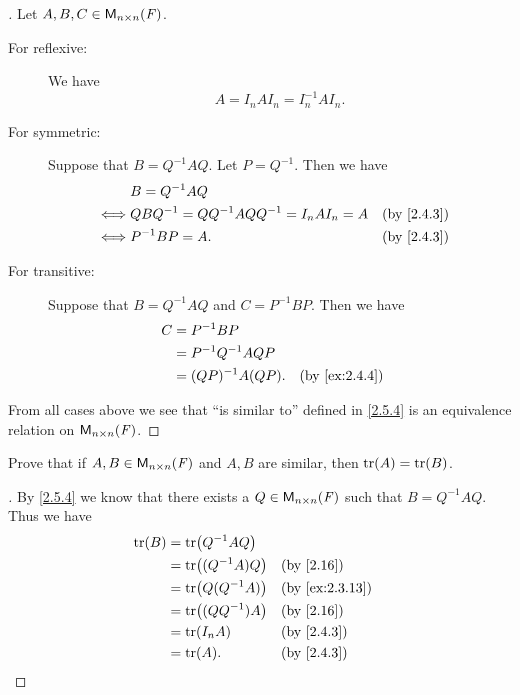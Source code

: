 \begin{proof}[]
  Let \(A, B, C \in \ms[n][n][\F]\).
  \begin{description}
    \item[For reflexive:]
      We have
      \[
        A = I_n A I_n = I_n^{-1} A I_n.
      \]
    \item[For symmetric:]
      Suppose that \(B = Q^{-1} A Q\).
      Let \(P = Q^{-1}\).
      Then we have
      \begin{align*}
             & B = Q^{-1} A Q                                                   \\
        \iff & Q B Q^{-1} = Q Q^{-1} A Q Q^{-1} = I_n A I_n = A &  & \by{2.4.3} \\
        \iff & P^{-1} B P = A.                                  &  & \by{2.4.3}
      \end{align*}
    \item[For transitive:]
      Suppose that \(B = Q^{-1} A Q\) and \(C = P^{-1} B P\).
      Then we have
      \begin{align*}
        C & = P^{-1} B P                             \\
          & = P^{-1} Q^{-1} A Q P                    \\
          & = (QP)^{-1} A (QP).   &  & \by{ex:2.4.4}
      \end{align*}
  \end{description}
  From all cases above we see that ``is similar to'' defined in \cref{2.5.4} is an equivalence relation on \(\ms[n][n][\F]\).
\end{proof}

\begin{ex}\label{ex:2.5.10}
  Prove that if \(A, B \in \ms[n][n][\F]\) and \(A, B\) are similar, then \(\tr[A] = \tr[B]\).
\end{ex}

\begin{proof}[]
  By \cref{2.5.4} we know that there exists a \(Q \in \ms[n][n][\F]\) such that \(B = Q^{-1} A Q\).
  Thus we have
  \begin{align*}
    \tr[B] & = \tr[Q^{-1} A Q]                       \\
           & = \tr[(Q^{-1} A) Q] &  & \by{2.16}      \\
           & = \tr[Q (Q^{-1} A)] &  & \by{ex:2.3.13} \\
           & = \tr[(Q Q^{-1}) A] &  & \by{2.16}      \\
           & = \tr[I_n A]        &  & \by{2.4.3}     \\
           & = \tr[A].           &  & \by{2.4.3}
  \end{align*}
\end{proof}


